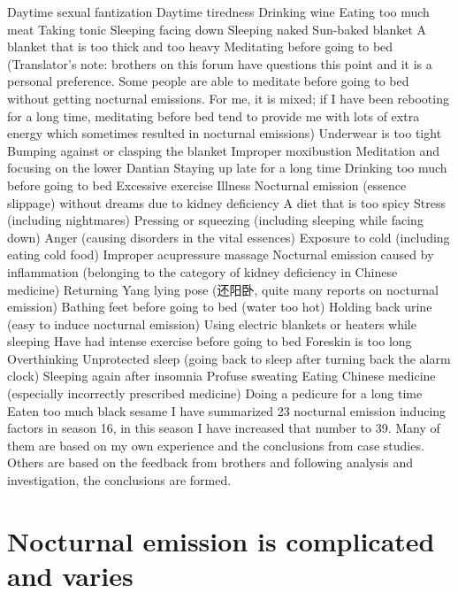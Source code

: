 \documentclass[
]{book}
\begin{document}
Daytime sexual fantization
Daytime tiredness
Drinking wine
Eating too much meat
Taking tonic
Sleeping facing down
Sleeping naked
Sun-baked blanket
A blanket that is too thick and too heavy
Meditating before going to bed (Translator's note: brothers on this forum have questions this point and it is a personal preference. Some people are able to meditate before going to bed without getting nocturnal emissions. For me, it is mixed; if I have been rebooting for a long time, meditating before bed tend to provide me with lots of extra energy which sometimes resulted in nocturnal emissions)
Underwear is too tight
Bumping against or clasping the blanket
Improper moxibustion
Meditation and focusing on the lower Dantian
Staying up late for a long time
Drinking too much before going to bed
Excessive exercise
Illness
Nocturnal emission (essence slippage) without dreams due to kidney deficiency
A diet that is too spicy
Stress (including nightmares)
Pressing or squeezing (including sleeping while facing down)
Anger (causing disorders in the vital essences)
Exposure to cold (including eating cold food)
Improper acupressure massage
Nocturnal emission caused by inflammation (belonging to the category of kidney deficiency in Chinese medicine)
Returning Yang lying pose (还阳卧, quite many reports on nocturnal emission)
Bathing feet before going to bed (water too hot)
Holding back urine (easy to induce nocturnal emission)
Using electric blankets or heaters while sleeping
Have had intense exercise before going to bed
Foreskin is too long
Overthinking
Unprotected sleep (going back to sleep after turning back the alarm clock)
Sleeping again after insomnia
Profuse sweating
Eating Chinese medicine (especially incorrectly prescribed medicine)
Doing a pedicure for a long time
Eaten too much black sesame
I have summarized 23 nocturnal emission inducing factors in season 16, in this season I have increased that number to 39. Many of them are based on my own experience and the conclusions from case studies. Others are based on the feedback from brothers and following analysis and investigation, the conclusions are formed.

\hypertarget{nocturnal-emission-is-complicated-and-varies}{%
\section{Nocturnal emission is complicated and varies}\label{nocturnal-emission-is-complicated-and-varies}}
\end{document}
